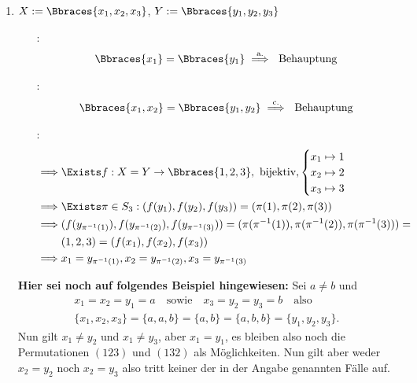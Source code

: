 \begin{solution}
\begin{enumerate}[label = \alph*.]
    \item $X := \Bbraces{x_1, x_2, x_3}$, $Y := \Bbraces{y_1, y_2, y_3}$

    \begin{itemize}

        \item
        [\Quote{$|X| = 1$}:]
        \begin{align*}
            \Bbraces{x_1} = \Bbraces{y_1}
            \stackrel{\text{a.}}{\implies}
            ~\text{Behauptung}
        \end{align*}

        \item
        [\Quote{$|X| = 2$}:]
        \begin{align*}
            \Bbraces{x_1, x_2} = \Bbraces{y_1, y_2}
            \stackrel{\text{c.}}{\implies}
            ~\text{Behauptung}
        \end{align*}

        \item
        [\Quote{$|X| = 3$}:]
        \begin{align*}
            \implies
            & \Exists f:
            X = Y \to \Bbraces{1, 2, 3},
            ~\text{bijektiv},
            \begin{cases}
                x_1 \mapsto 1 \\
                x_2 \mapsto 2 \\
                x_3 \mapsto 3
            \end{cases} \\
            \implies
            & \Exists \pi \in S_3: (f(y_1), f(y_2), f(y_3)) = (\pi(1), \pi(2), \pi(3)) \\
            \implies
            & (f(y_{\pi^{-1}(1)}), f(y_{\pi^{-1}(2)}), f(y_{\pi^{-1}(3)})) = (\pi(\pi^{-1}(1)), \pi(\pi^{-1}(2)), \pi(\pi^{-1}(3))) = \\
            & (1, 2, 3) = (f(x_1), f(x_2), f(x_3)) \\
            \implies
            & x_1 = y_{\pi^{-1}(1)}, x_2 = y_{\pi^{-1}(2)}, x_3 = y_{\pi^{-1}(3)}
        \end{align*}

    \end{itemize}
	\textbf{Hier sei noch auf folgendes Beispiel hingewiesen:} Sei $a \neq b$ und 
	\begin{align*}
	x_1 = x_2 = y_1 = a \quad \text{sowie} \quad x_3 = y_2 = y_3 = b \quad \text{also} \quad \\
	\{x_1, x_2, x_3\} = \{a,a,b\} = \{a,b\}  = \{a,b,b\} = \{y_1, y_2, y_3\}.
	\end{align*}
	Nun gilt $x_1 \neq y_2$ und $x_1 \neq y_3$, aber $x_1 = y_1$, es bleiben also noch die Permutationen $(123)$ und $(132)$ als Möglichkeiten. Nun gilt aber weder $x_2 = y_2$ noch $x_2 = y_3$ also tritt keiner der in der Angabe genannten Fälle auf.
\end{enumerate}

\end{solution}

